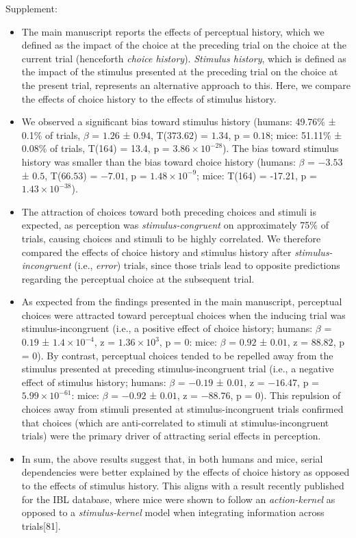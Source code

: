 \documentclass[
]{article}
\begin{document}
Supplement:

\begin{itemize}
\item
  The main manuscript reports the effects of perceptual history, which
  we defined as the impact of the choice at the preceding trial on the
  choice at the current trial (henceforth \emph{choice history}).
  \emph{Stimulus history}, which is defined as the impact of the
  stimulus presented at the preceding trial on the choice at the present
  trial, represents an alternative approach to this. Here, we compare
  the effects of choice history to the effects of stimulus history.
\item
  We observed a significant bias toward stimulus history (humans:
  49.76\% ± 0.1\% of trials, \(\beta\) = \(1.26\) ± \(0.94\),
  T(\(373.62\)) = \(1.34\), p = \(0.18\); mice: 51.11\% ± 0.08\% of
  trials, T(164) = 13.4, p = \(\ensuremath{3.86\times 10^{-28}}\)). The
  bias toward stimulus history was smaller than the bias toward choice
  history (humans: \(\beta\) = \(-3.53\) ± \(0.5\), T(\(66.53\)) =
  \(-7.01\), p = \(\ensuremath{1.48\times 10^{-9}}\); mice: T(164) =
  -17.21, p = \(\ensuremath{1.43\times 10^{-38}}\)).
\item
  The attraction of choices toward both preceding choices and stimuli is
  expected, as perception was \emph{stimulus-congruent} on approximately
  75\% of trials, causing choices and stimuli to be highly correlated.
  We therefore compared the effects of choice history and stimulus
  history after \emph{stimulus-incongruent} (i.e., \emph{error}) trials,
  since those trials lead to opposite predictions regarding the
  perceptual choice at the subsequent trial.
\item
  As expected from the findings presented in the main manuscript,
  perceptual choices were attracted toward perceptual choices when the
  inducing trial was stimulus-incongruent (i.e., a positive effect of
  choice history; humans: \(\beta\) = \(0.19\) ±
  \(\ensuremath{1.4\times 10^{-4}}\), z =
  \(\ensuremath{1.36\times 10^{3}}\), p = \(0\): mice: \(\beta\) =
  \(0.92\) ± \(0.01\), z = \(88.82\), p = \(0\)). By contrast,
  perceptual choices tended to be repelled away from the stimulus
  presented at preceding stimulus-incongruent trial (i.e., a negative
  effect of stimulus history; humans: \(\beta\) = \(-0.19\) ± \(0.01\),
  z = \(-16.47\), p = \(\ensuremath{5.99\times 10^{-61}}\): mice:
  \(\beta\) = \(-0.92\) ± \(0.01\), z = \(-88.76\), p = \(0\)). This
  repulsion of choices away from stimuli presented at
  stimulus-incongruent trials confirmed that choices (which are
  anti-correlated to stimuli at stimulus-incongruent trials) were the
  primary driver of attracting serial effects in perception.
\item
  In sum, the above results suggest that, in both humans and mice,
  serial dependencies were better explained by the effects of choice
  history as opposed to the effects of stimulus history. This aligns
  with a result recently published for the IBL database, where mice were
  shown to follow an \emph{action-kernel} as opposed to a
  \emph{stimulus-kernel} model when integrating information across
  trials{[}81{]}.
\end{itemize}
\end{document}
